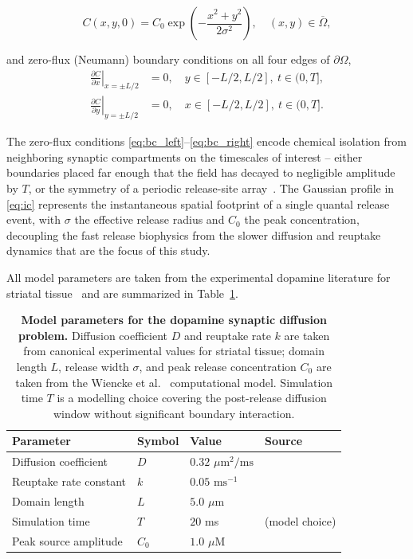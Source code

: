 \documentclass[12pt]{article}
\begin{document}
\begin{equation}
  C(x, y, 0) = C_0 \exp\!\left( -\frac{x^2 + y^2}{2\sigma^2} \right),
  \quad (x, y) \in \overline{\Omega},
  \label{eq:ic}
\end{equation}

and zero-flux (Neumann) boundary conditions on all four edges
of $\partial \Omega$,
\begin{align}
  \left.\frac{\partial C}{\partial x}\right|_{x=\pm L/2}
    &= 0, \quad y \in [-L/2, L/2],\ t \in (0, T],
    \label{eq:bc_left} \\
  \left.\frac{\partial C}{\partial y}\right|_{y=\pm L/2}
    &= 0, \quad x \in [-L/2, L/2],\ t \in (0, T].
    \label{eq:bc_right}
\end{align}

The zero-flux conditions \eqref{eq:bc_left}--\eqref{eq:bc_right}
encode chemical isolation from neighboring synaptic compartments
on the timescales of interest -- either boundaries placed far
enough that the field has decayed to negligible amplitude by
$T$, or the symmetry of a periodic release-site
array~\cite{Wiencke2020}. The Gaussian profile in \eqref{eq:ic}
represents the instantaneous spatial footprint of a single
quantal release event, with $\sigma$ the effective release
radius and $C_0$ the peak concentration, decoupling the fast
release biophysics from the slower diffusion and reuptake
dynamics that are the focus of this study.

All model parameters are taken from the experimental dopamine
literature for striatal tissue~\cite{CraggRice2004, Nicholson1981}
and are summarized in Table~\ref{tab:params}.

\begin{table}[h!]
\centering
\caption{\textbf{Model parameters for the dopamine synaptic
diffusion problem.} Diffusion coefficient $D$ and
reuptake rate $k$ are taken from canonical experimental
values for striatal tissue; domain length $L$, release width
$\sigma$, and peak release concentration $C_0$ are taken
from the Wiencke et al.~\cite{Wiencke2020} computational
model. Simulation time $T$ is a modelling choice covering
the post-release diffusion window without significant
boundary interaction.}
\label{tab:params}
\begin{tabular}{llll}
\toprule
\textbf{Parameter} & \textbf{Symbol} & \textbf{Value} & \textbf{Source} \\
\midrule
Diffusion coefficient    & $D$   & $0.32$ $\mu\text{m}^2/\text{ms}$ & \cite{Nicholson1981, CraggRice2004} \\
Reuptake rate constant   & $k$   & $0.05$ $\text{ms}^{-1}$           & \cite{CraggRice2004} \\
Domain length            & $L$   & $5.0$ $\mu\text{m}$               & \cite{Wiencke2020} \\
Simulation time          & $T$   & $20$ ms                            & (model choice) \\
Peak source amplitude    & $C_0$ & $1.0$ $\mu$M                       & \cite{Wiencke2020} \\
\bottomrule
\end{tabular}
\end{table}
\end{document}
